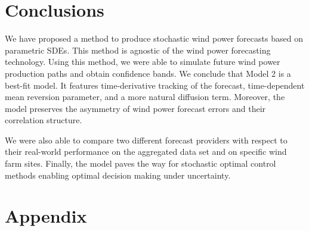 \documentclass[11pt]{article}
\theoremstyle{definition}
\begin{document}
\section{Conclusions} \label{Section_8}

We have proposed a method to produce stochastic wind power forecasts based on parametric SDEs. This method is agnostic of the wind power forecasting technology. Using this method, we were able to simulate future wind power production paths and obtain confidence bands. We conclude that Model 2 is a best-fit model. It features time-derivative tracking of the forecast, time-dependent mean reversion parameter, and a more natural diffusion term. Moreover, the model preserves the asymmetry of wind power forecast errors and their correlation structure.

We were also able to compare two different forecast providers with respect to their real-world performance on the aggregated data set and on specific wind farm sites. Finally, the model paves the way for stochastic optimal control methods enabling optimal decision making under uncertainty.

\section{Appendix} \label{Appendix}
\end{document}
